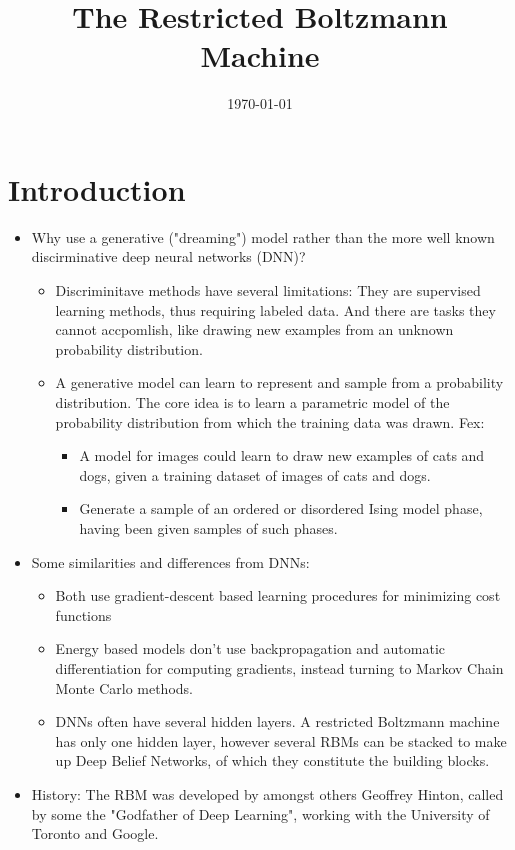 \documentclass[norsk,a4paper,11pt]{article}
\title{The Restricted Boltzmann Machine}
\begin{document}
\date{\today}
\maketitle


\section{Introduction}
\begin{itemize}
	\item Why use a generative ("dreaming") model rather than the more well known discirminative deep neural networks (DNN)? 
	\begin{itemize}
		\item Discriminitave methods have several limitations: They are supervised learning methods, thus requiring labeled data. And there are tasks they cannot accpomlish, like drawing new examples from an unknown probability distribution.
		\item A generative model can learn to represent and sample from a probability distribution. The core idea is to learn a parametric model of the probability distribution from which the training data was drawn. Fex: 
		\begin{itemize}
			\item A model for images could learn to draw new examples of cats and dogs, given a training dataset of images of cats and dogs.
			\item Generate a sample of an ordered or disordered Ising model phase, having been given samples of such phases.
		\end{itemize}
	\end{itemize}
	\item Some similarities and differences from DNNs:
	\begin{itemize}
		\item Both use gradient-descent based learning procedures for minimizing cost functions
		\item Energy based models don't use backpropagation and automatic differentiation for computing gradients, instead turning to Markov Chain Monte Carlo methods.
		\item DNNs often have several hidden layers. A restricted Boltzmann machine has only one hidden layer, however several RBMs can be stacked to make up Deep Belief Networks, of which they constitute the building blocks.
	\end{itemize}
	\item History: The RBM was developed by amongst others Geoffrey Hinton, called by some the "Godfather of Deep Learning", working with the University of Toronto and Google.
\end{itemize}
\end{document}
